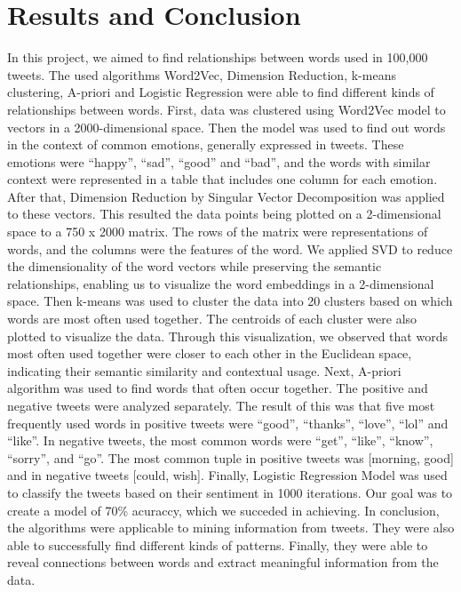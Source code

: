 \documentclass[11pt,a4paper]{article}
\begin{document}
\section{Results and Conclusion}
In this project, we aimed to find relationships between words used in 100,000 tweets. The used algorithms Word2Vec, Dimension Reduction, k-means clustering, A-priori and Logistic Regression were able to find different kinds of relationships between words.
First, data was clustered using Word2Vec model to vectors in a 2000-dimensional space. Then the model was used to find out words in the context of common emotions, generally expressed in tweets. These emotions were “happy”, “sad”, “good” and “bad”, and the words with similar context were represented in a table that includes one column for each emotion.
After that, Dimension Reduction by Singular Vector Decomposition was applied to these vectors. This resulted the data points being plotted on a 2-dimensional space to a 750 x 2000 matrix. The rows of the matrix were representations of words, and the columns were the features of the word. We applied SVD to reduce the dimensionality of the word vectors while preserving the semantic relationships, enabling us to visualize the word embeddings in a 2-dimensional space.
Then k-means was used to cluster the data into 20 clusters based on which words are most often used together. The centroids of each cluster were also plotted to visualize the data. Through this visualization, we observed that words most often used together were closer to each other in the Euclidean space, indicating their semantic similarity and contextual usage.
Next, A-priori algorithm was used to find words that often occur together. The positive and negative tweets were analyzed separately. The result of this was that five most frequently used words in positive tweets were “good”, “thanks”, “love”, “lol” and “like”. In negative tweets, the most common words were “get”, “like”, “know”, “sorry”, and “go”. 
The most common tuple in positive tweets was [morning, good] and in negative tweets [could, wish]. 
Finally, Logistic Regression Model was used to classify the tweets based on their sentiment in 1000 iterations. Our goal was to create a model of 70\% acuraccy, which we succeded in achieving.
In conclusion, the algorithms were applicable to mining information from tweets. They were also able to successfully find different kinds of patterns. Finally, they were able to reveal connections between words and extract meaningful information from the data.
\end{document}
